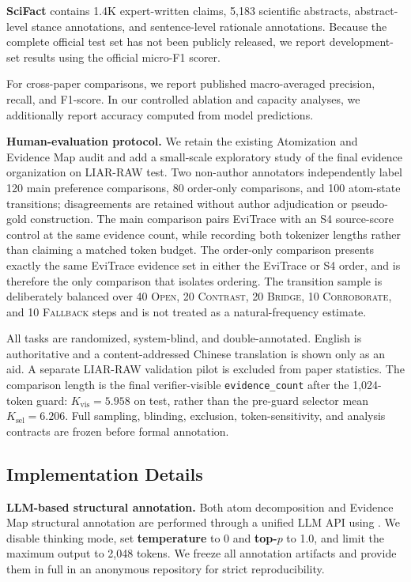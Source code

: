 \documentclass[letterpaper]{article}
\begin{document}
\textbf{SciFact} \citep{Wadden2020SciFact} contains
1.4K expert-written claims, 5,183 scientific abstracts,
abstract-level stance annotations, and sentence-level
rationale annotations. Because the complete official test
set has not been publicly released, we report development-set
results using the official micro-F1 scorer.

For cross-paper comparisons, we report published
macro-averaged precision, recall, and F1-score. In our
controlled ablation and capacity analyses, we additionally
report accuracy computed from model predictions.

\textbf{Human-evaluation protocol.}
We retain the existing Atomization and Evidence Map audit and add a
small-scale exploratory study of the final evidence organization on
LIAR-RAW test. Two non-author annotators independently label 120 main
preference comparisons, 80 order-only comparisons, and 100 atom-state
transitions; disagreements are retained without author adjudication or
pseudo-gold construction. The main comparison pairs EviTrace with an
S4 source-score control at the same evidence count, while recording
both tokenizer lengths rather than claiming a matched token budget.
The order-only comparison presents exactly the same EviTrace evidence
set in either the EviTrace or S4 order, and is therefore the only
comparison that isolates ordering. The transition sample is deliberately
balanced over 40 \textsc{Open}, 20 \textsc{Contrast}, 20 \textsc{Bridge},
10 \textsc{Corroborate}, and 10 \textsc{Fallback} steps and is not treated
as a natural-frequency estimate.

All tasks are randomized, system-blind, and double-annotated. English is
authoritative and a content-addressed Chinese translation is shown only
as an aid. A separate LIAR-RAW validation pilot is excluded from paper
statistics. The comparison length is the final verifier-visible
\texttt{evidence\_count} after the 1,024-token guard:
\(K_{\mathrm{vis}}=5.958\) on test, rather than the pre-guard selector
mean \(K_{\mathrm{sel}}=6.206\). Full sampling, blinding, exclusion,
token-sensitivity, and analysis contracts are frozen before formal
annotation.

\subsection{Implementation Details}

\textbf{LLM-based structural annotation.} Both atom decomposition and Evidence Map structural annotation are performed through a unified LLM API using \texttt{} \citep{DeepSeekAI2026V4}. We disable thinking mode, set \textbf{temperature} to 0 and \textbf{top-$p$} to 1.0, and limit the maximum output to 2,048 tokens. We freeze all annotation artifacts and provide them in full in an anonymous repository for strict reproducibility.
\end{document}
